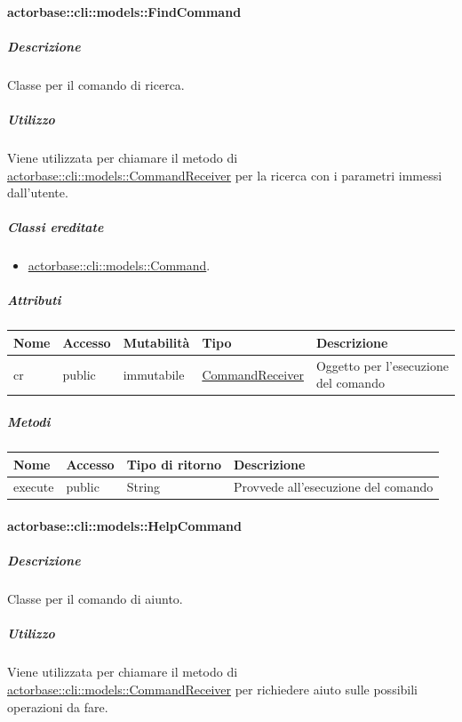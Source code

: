\documentclass{scalatekids-article}
\begin{document}
\paragraph{actorbase::cli::models::FindCommand}
\label{sec:actorbase::cli::models::FindCommand}

\subparagraph{Descrizione}

Classe per il comando di ricerca.

\subparagraph{Utilizzo}

Viene utilizzata per chiamare il metodo di
\hyperref[sec:actorbase::cli::models::CommandReceiver]{actorbase::cli::models::CommandReceiver} per la ricerca con i parametri immessi
dall'utente.

\subparagraph{Classi ereditate}

\begin{itemize}
\item \hyperref[sec:actorbase::cli::models::Command]{actorbase::cli::models::Command}.
\end{itemize}

\subparagraph{Attributi}

\begin{tabular}{| p{1cm} | p{1.5cm} | p{2cm} | p{4cm} | p{8.5cm} |}
  \hline
  Nome & Accesso & Mutabilità & Tipo & Descrizione\\
  \hline
  cr & public & immutabile & \hyperref[sec:actorbase::cli::models::CommandReceiver]{CommandReceiver} & Oggetto per l'esecuzione del comando \\
  \hline
\end{tabular}

\subparagraph{Metodi}

\begin{tabular}{| l | l | l | l |}
  \hline
  Nome & Accesso & Tipo di ritorno & Descrizione\\
  \hline
  execute & public & String & Provvede all'esecuzione del comando\\
  \hline
\end{tabular}


\paragraph{actorbase::cli::models::HelpCommand}
\label{sec:actorbase::cli::models::HelpCommand}

\subparagraph{Descrizione}

Classe per il comando di aiunto.

\subparagraph{Utilizzo}
Viene utilizzata per chiamare il metodo di
\hyperref[sec:actorbase::cli::models::CommandReceiver]{actorbase::cli::models::CommandReceiver} per richiedere aiuto sulle possibili operazioni da fare.
\end{document}
